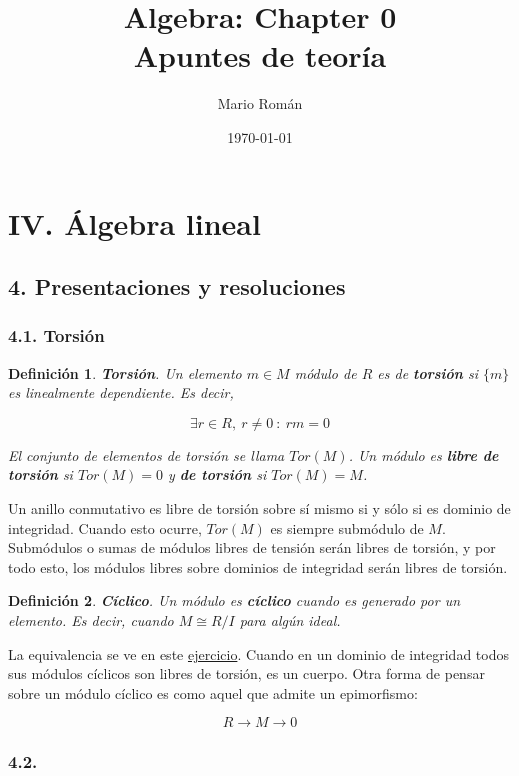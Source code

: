 \documentclass[11pt]{article}
\author{Mario Román}
\date{\today}
\title{Algebra: Chapter 0\\\medskip
\large Apuntes de teoría}
\newtheorem{definition}{Definición}
\begin{document}
\maketitle

\section*{IV. Álgebra lineal}
\label{sec:orgheadline4}
\subsection*{4. Presentaciones y resoluciones}
\label{sec:orgheadline3}
\subsubsection*{4.1. Torsión}
\label{sec:orgheadline1}
\begin{definition}
\textbf{Torsión}. Un elemento \(m \in M\) módulo de \(R\) es de \textbf{torsión} si \(\{m\}\) es linealmente
dependiente. Es decir,

\[ \exists r \in R,\ r \neq 0\ :\ rm = 0 \]

El conjunto de elementos de torsión se llama \(Tor(M)\). Un módulo es \textbf{libre de torsión}
si \(Tor(M) = 0\) y \textbf{de torsión} si \(Tor(M)=M\).
\end{definition}

Un anillo conmutativo es libre de torsión sobre sí mismo si y sólo si es dominio de
integridad. Cuando esto ocurre, \(Tor(M)\) es siempre submódulo de \(M\). Submódulos o
sumas de módulos libres de tensión serán libres de torsión, y por todo esto, los módulos
libres sobre dominios de integridad serán libres de torsión.

\begin{definition}
\textbf{Cíclico}. Un módulo es \textbf{cíclico} cuando es generado por un elemento. Es decir,
cuando \(M \cong R/I\) para algún ideal.
\end{definition}

La equivalencia se ve en este \href{aluffi.org}{ejercicio}. Cuando en un dominio de integridad todos sus
módulos cíclicos son libres de torsión, es un cuerpo. Otra forma de pensar sobre un módulo
cíclico es como aquel que admite un epimorfismo:

\[ R \rightarrow M \rightarrow 0 \]

\subsubsection*{4.2.}
\label{sec:orgheadline2}
\end{document}
